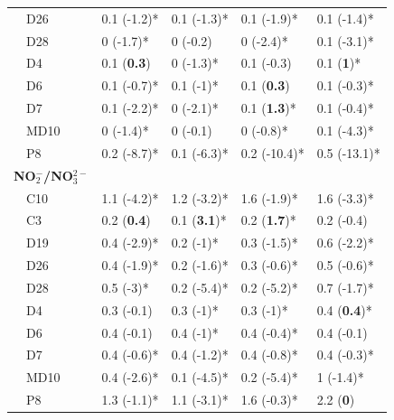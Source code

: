 \documentclass[letterpaper,12pt,oneside]{article}\usepackage[]{graphicx}\usepackage[]{color}
\begin{document}
\begin{table}[!tbp]
\begin{center}
\begin{tabular}{lllll}
~~D26&0.1 \footnotesize{(-1.2)*}&0.1 \footnotesize{(-1.3)*}&0.1 \footnotesize{(-1.9)*}&0.1 \footnotesize{(-1.4)*}\tabularnewline
~~D28&0 \footnotesize{(-1.7)*}&0 \footnotesize{(-0.2)}&0 \footnotesize{(-2.4)*}&0.1 \footnotesize{(-3.1)*}\tabularnewline
~~D4&0.1 \footnotesize{(\textbf{0.3})}&0 \footnotesize{(-1.3)*}&0.1 \footnotesize{(-0.3)}&0.1 \footnotesize{(\textbf{1})*}\tabularnewline
~~D6&0.1 \footnotesize{(-0.7)*}&0.1 \footnotesize{(-1)*}&0.1 \footnotesize{(\textbf{0.3})}&0.1 \footnotesize{(-0.3)*}\tabularnewline
~~D7&0.1 \footnotesize{(-2.2)*}&0 \footnotesize{(-2.1)*}&0.1 \footnotesize{(\textbf{1.3})*}&0.1 \footnotesize{(-0.4)*}\tabularnewline
~~MD10&0 \footnotesize{(-1.4)*}&0 \footnotesize{(-0.1)}&0 \footnotesize{(-0.8)*}&0.1 \footnotesize{(-4.3)*}\tabularnewline
~~P8&0.2 \footnotesize{(-8.7)*}&0.1 \footnotesize{(-6.3)*}&0.2 \footnotesize{(-10.4)*}&0.5 \footnotesize{(-13.1)*}\tabularnewline
\hline
{\bfseries NO$_{2}^{-}$/NO$_{3}^{2-}$}&&&&\tabularnewline
~~C10&1.1 \footnotesize{(-4.2)*}&1.2 \footnotesize{(-3.2)*}&1.6 \footnotesize{(-1.9)*}&1.6 \footnotesize{(-3.3)*}\tabularnewline
~~C3&0.2 \footnotesize{(\textbf{0.4})}&0.1 \footnotesize{(\textbf{3.1})*}&0.2 \footnotesize{(\textbf{1.7})*}&0.2 \footnotesize{(-0.4)}\tabularnewline
~~D19&0.4 \footnotesize{(-2.9)*}&0.2 \footnotesize{(-1)*}&0.3 \footnotesize{(-1.5)*}&0.6 \footnotesize{(-2.2)*}\tabularnewline
~~D26&0.4 \footnotesize{(-1.9)*}&0.2 \footnotesize{(-1.6)*}&0.3 \footnotesize{(-0.6)*}&0.5 \footnotesize{(-0.6)*}\tabularnewline
~~D28&0.5 \footnotesize{(-3)*}&0.2 \footnotesize{(-5.4)*}&0.2 \footnotesize{(-5.2)*}&0.7 \footnotesize{(-1.7)*}\tabularnewline
~~D4&0.3 \footnotesize{(-0.1)}&0.3 \footnotesize{(-1)*}&0.3 \footnotesize{(-1)*}&0.4 \footnotesize{(\textbf{0.4})*}\tabularnewline
~~D6&0.4 \footnotesize{(-0.1)}&0.4 \footnotesize{(-1)*}&0.4 \footnotesize{(-0.4)*}&0.4 \footnotesize{(-0.1)}\tabularnewline
~~D7&0.4 \footnotesize{(-0.6)*}&0.4 \footnotesize{(-1.2)*}&0.4 \footnotesize{(-0.8)*}&0.4 \footnotesize{(-0.3)*}\tabularnewline
~~MD10&0.4 \footnotesize{(-2.6)*}&0.1 \footnotesize{(-4.5)*}&0.2 \footnotesize{(-5.4)*}&1 \footnotesize{(-1.4)*}\tabularnewline
~~P8&1.3 \footnotesize{(-1.1)*}&1.1 \footnotesize{(-3.1)*}&1.6 \footnotesize{(-0.3)*}&2.2 \footnotesize{(\textbf{0})}\tabularnewline
\hline
\end{tabular}\end{center}
\end{table}
\end{document}
